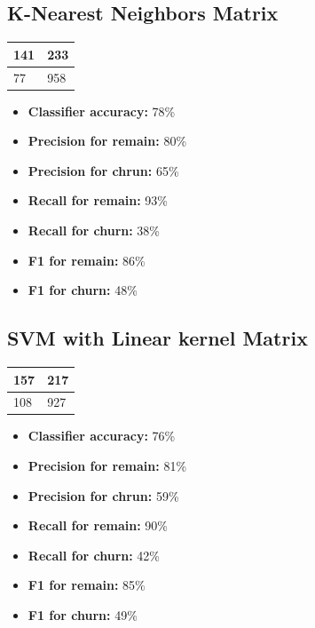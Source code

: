 \documentclass[12pt]{article}
\begin{document}
\subsection{K-Nearest Neighbors Matrix}
\begin{table}[ht]
  \large
  \centering
\begin{tabular}{|l|l|}
  \hline
  141 & 233\\
  \hline
  77 & 958\\
  \hline
\end{tabular}
\end{table}
\begin{itemize}
  \item \textbf{Classifier accuracy:} 78\%
  \item \textbf{Precision for remain:} 80\%
  \item \textbf{Precision for chrun:} 65\%
  \item \textbf{Recall for remain:} 93\%
  \item \textbf{Recall for churn:} 38\%
  \item \textbf{F1 for remain:} 86\%
  \item \textbf{F1 for churn:} 48\%
\end{itemize}

\vspace{\baselineskip}

\subsection{SVM with Linear kernel Matrix}
\begin{table}[ht]
  \large
  \centering
\begin{tabular}{|l|l|}
  \hline
  157 & 217\\
  \hline
  108 & 927\\
  \hline
\end{tabular}
\end{table}
\begin{itemize}
  \item \textbf{Classifier accuracy:} 76\%
  \item \textbf{Precision for remain:} 81\%
  \item \textbf{Precision for chrun:} 59\%
  \item \textbf{Recall for remain:} 90\%
  \item \textbf{Recall for churn:} 42\%
  \item \textbf{F1 for remain:} 85\%
  \item \textbf{F1 for churn:} 49\%
\end{itemize}
\end{document}
